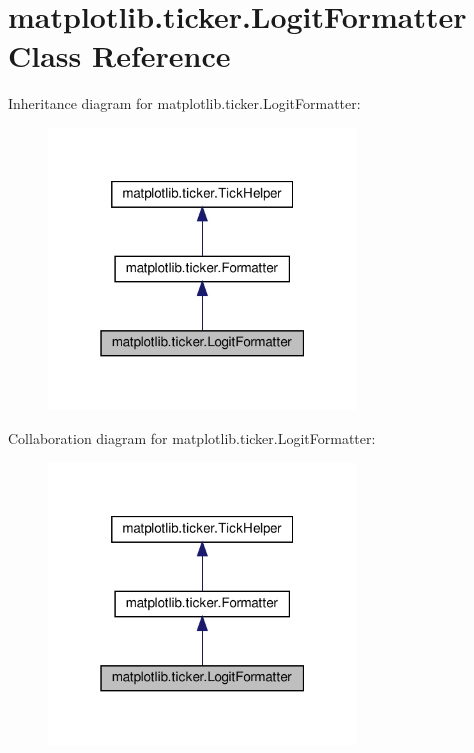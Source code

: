 \hypertarget{classmatplotlib_1_1ticker_1_1LogitFormatter}{}\section{matplotlib.\+ticker.\+Logit\+Formatter Class Reference}
\label{classmatplotlib_1_1ticker_1_1LogitFormatter}


Inheritance diagram for matplotlib.\+ticker.\+Logit\+Formatter\+:
\nopagebreak
\begin{figure}[H]
\begin{center}
\leavevmode
\includegraphics[width=232pt]{classmatplotlib_1_1ticker_1_1LogitFormatter__inherit__graph}
\end{center}
\end{figure}


Collaboration diagram for matplotlib.\+ticker.\+Logit\+Formatter\+:
\nopagebreak
\begin{figure}[H]
\begin{center}
\leavevmode
\includegraphics[width=232pt]{classmatplotlib_1_1ticker_1_1LogitFormatter__coll__graph}
\end{center}
\end{figure}
